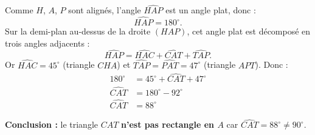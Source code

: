 \documentclass[answers]{exam}
\begin{document}
\begin{questions}
\begin{solution}
\medskip

Comme $H$, $A$, $P$ sont alignés, l'angle $\widehat{HAP}$ est un angle plat, donc :
\[
\widehat{HAP} = 180^\circ.
\]
Sur la demi-plan au-dessus de la droite $(HAP)$, cet angle plat est décomposé en trois angles adjacents :
\[
\widehat{HAP} = \widehat{HAC} + \widehat{CAT} + \widehat{TAP}.
\]
Or $\widehat{HAC}=45^\circ$ (triangle $CHA$) et $\widehat{TAP}=\widehat{PAT}=47^\circ$ (triangle $APT$). Donc :
\begin{align*}
180^\circ &= 45^\circ + \widehat{CAT} + 47^\circ \\
\widehat{CAT} &= 180^\circ - 92^\circ \\
\widehat{CAT} &= 88^\circ
\end{align*}
\medskip

\textbf{Conclusion :} le triangle $CAT$ \textbf{n'est pas rectangle en $A$} car $\widehat{CAT} = 88^\circ \neq 90^\circ$.
\end{solution}

\end{questions}
\end{document}
